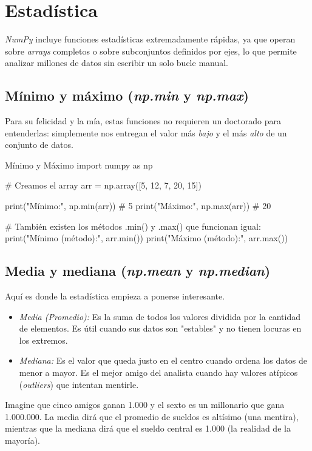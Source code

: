 \section{Estadística}

\textit{NumPy} incluye funciones estadísticas extremadamente rápidas, ya que operan sobre \textit{arrays} completos o sobre subconjuntos definidos por ejes, lo que permite analizar millones de datos sin escribir un solo bucle manual.

\subsection{Mínimo y máximo (\textit{np.min} y \textit{np.max})}

Para su felicidad y la mía, estas funciones no requieren un doctorado para entenderlas: simplemente nos entregan el valor más \textit{bajo} y el más \textit{alto} de un conjunto de datos.

\begin{pycode}{Mínimo y Máximo}
import numpy as np

# Creamos el array
arr = np.array([5, 12, 7, 20, 15])

print("Mínimo:", np.min(arr)) # 5
print("Máximo:", np.max(arr)) # 20


# También existen los métodos .min() y .max() que funcionan igual:
print("Mínimo (método):", arr.min())
print("Máximo (método):", arr.max())
\end{pycode}



\subsection{Media y mediana (\textit{np.mean} y \textit{np.median})}

Aquí es donde la estadística empieza a ponerse interesante.
\begin{itemize}
\item \textit{Media (Promedio):} Es la suma de todos los valores dividida por la cantidad de elementos. Es útil cuando sus datos son "estables" y no tienen locuras en los extremos.
\item \textit{Mediana:} Es el valor que queda justo en el centro cuando ordena los datos de menor a mayor. Es el mejor amigo del analista cuando hay valores atípicos (\textit{outliers}) que intentan mentirle.
\end{itemize}
\begin{ejemplo}
        Imagine que cinco amigos ganan 1.000 y el sexto es un millonario que gana 1.000.000. La media dirá que el promedio de sueldos es altísimo (una mentira), mientras que la mediana dirá que el sueldo central es 1.000 (la realidad de la mayoría).
\end{ejemplo}

